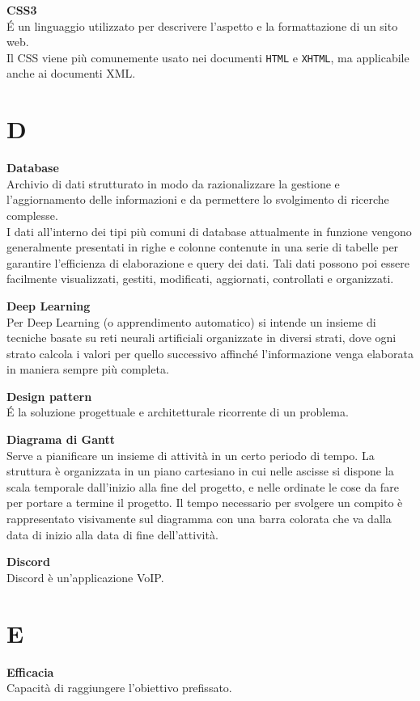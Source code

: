 \documentclass[a4paper, oneside, openany, dvipsnames, table, 12pt]{article}
\begin{document}
\label{par:css3}
\textbf{CSS3} \\
\'E un linguaggio utilizzato per descrivere l’aspetto e la formattazione di un sito web. \\
Il CSS viene più comunemente usato nei documenti \texttt{HTML} e \texttt{XHTML}, ma applicabile anche ai documenti XML. 

\newpage
\section{D}
\label{par:db}
\textbf{Database} \\
Archivio di dati strutturato in modo da razionalizzare la gestione e l'aggiornamento delle informazioni e da permettere lo svolgimento di ricerche complesse. \\
I dati all'interno dei tipi più comuni di database attualmente in funzione vengono generalmente presentati in righe e colonne contenute in una serie di tabelle per garantire l'efficienza di elaborazione e query dei dati. Tali dati possono poi essere facilmente visualizzati, gestiti, modificati, aggiornati, controllati e organizzati.

\textbf{Deep Learning} \\
Per Deep Learning (o apprendimento automatico) si intende un insieme di tecniche basate su reti neurali artificiali organizzate in diversi strati, dove ogni strato calcola i valori per quello successivo affinché l'informazione venga elaborata in maniera sempre più completa.

\textbf{Design pattern} \\
\'E la soluzione progettuale e architetturale ricorrente di un problema.

\textbf{Diagrama di Gantt} \\
Serve a pianificare un insieme di attività in un certo periodo di tempo. La struttura è organizzata in un piano cartesiano in cui nelle ascisse si dispone la scala temporale dall’inizio alla fine del progetto, e nelle ordinate le cose da fare per portare a termine il progetto. Il tempo necessario per svolgere un compito è rappresentato visivamente sul diagramma con una barra colorata che va dalla data di inizio alla data di fine dell’attività.

\textbf{Discord} \\
Discord è un'applicazione VoIP\glo.

\newpage
\section{E}
\textbf{Efficacia} \\
Capacità di raggiungere l'obiettivo prefissato.
\end{document}
